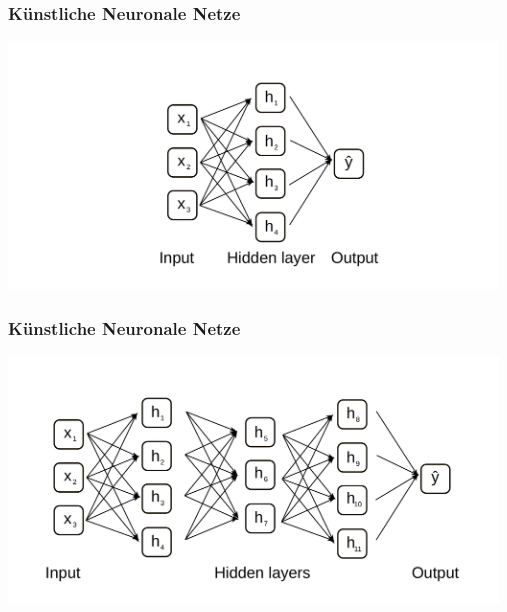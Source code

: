 \documentclass[aspectratio=169]{beamer}
\begin{document}
\begin{frame}
  \frametitle{Künstliche Neuronale Netze}
  \begin{center}
    \includegraphics[width=13.0cm]{images/ANN_with_hidden_layer.pdf}
  \end{center}  
\end{frame}


\begin{frame}
  \frametitle{Künstliche Neuronale Netze}
  \begin{center}
    \includegraphics[width=13.0cm]{images/ANN_with_serveral_hidden_layers.pdf}
  \end{center}  
\end{frame}
\end{document}
